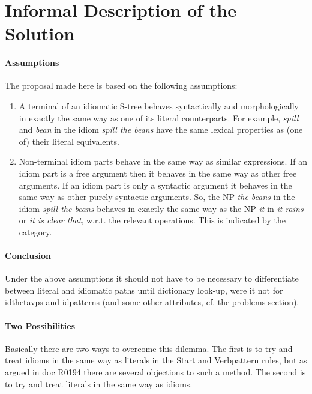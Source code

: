\section{Informal Description of the Solution}
\paragraph{Assumptions}
The proposal made here is based on the following assumptions:
\begin{enumerate}
  \item A terminal of an idiomatic S-tree behaves syntactically and 
morphologically in exactly the same way as one of its literal counterparts. For 
example, {\em spill} and {\em bean} in the idiom {\em spill the beans} have the 
same lexical properties as (one of) their literal equivalents.
  \item Non-terminal idiom parts behave in the same way as similar expressions. 
If an idiom part is a free argument then it behaves in the same way as other 
free arguments. If an idiom part is only a syntactic argument it behaves in the 
same way as other purely syntactic arguments. So, the NP {\em the beans} in the 
idiom {\em spill the beans} behaves in exactly the same way as the NP {\em it} 
in {\em it rains} or {\em it is clear that}, w.r.t. the relevant operations.
This is indicated by the category. 
\end{enumerate} 

\paragraph{Conclusion}
Under the above assumptions it should not have to be necessary to 
differentiate between literal and idiomatic paths until dictionary look-up, 
were it not for idthetavps and idpatterns (and some other attributes, cf. the 
problems section).

\paragraph{Two Possibilities}
Basically there are two ways to overcome this dilemma. The first is to try and
treat idioms in the same way as literals in the Start and Verbpattern rules, 
but as argued in doc R0194 there are several objections to such a method. The 
second is to try and treat literals in the same way as idioms.

